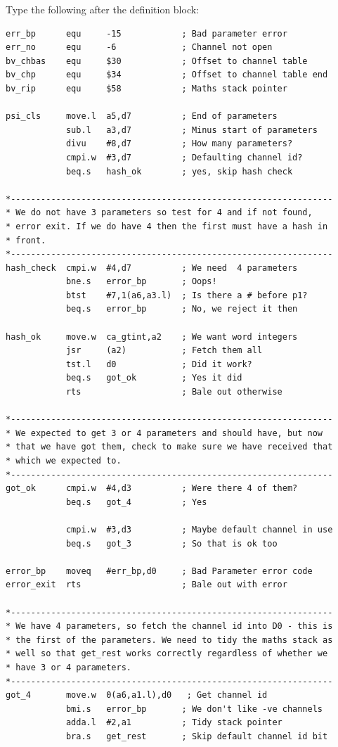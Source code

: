 Type the following after the definition block:
\begin{lstlisting}[firstnumber=13,caption={PSI\_CLS - The Final Version - Part 1},label={lst:PsiClsFinalVersionPart1}]
err_bp      equ     -15            ; Bad parameter error
err_no      equ     -6             ; Channel not open
bv_chbas    equ     $30            ; Offset to channel table
bv_chp      equ     $34            ; Offset to channel table end
bv_rip      equ     $58            ; Maths stack pointer

psi_cls     move.l  a5,d7          ; End of parameters
            sub.l   a3,d7          ; Minus start of parameters
            divu    #8,d7          ; How many parameters?
            cmpi.w  #3,d7          ; Defaulting channel id?
            beq.s   hash_ok        ; yes, skip hash check

*----------------------------------------------------------------
* We do not have 3 parameters so test for 4 and if not found, 
* error exit. If we do have 4 then the first must have a hash in
* front.
*----------------------------------------------------------------
hash_check  cmpi.w  #4,d7          ; We need  4 parameters
            bne.s   error_bp       ; Oops!
            btst    #7,1(a6,a3.l)  ; Is there a # before p1?
            beq.s   error_bp       ; No, we reject it then

hash_ok     move.w  ca_gtint,a2    ; We want word integers
            jsr     (a2)           ; Fetch them all
            tst.l   d0             ; Did it work?
            beq.s   got_ok         ; Yes it did
            rts                    ; Bale out otherwise

*----------------------------------------------------------------
* We expected to get 3 or 4 parameters and should have, but now 
* that we have got them, check to make sure we have received that 
* which we expected to.
*----------------------------------------------------------------
got_ok      cmpi.w  #4,d3          ; Were there 4 of them?
            beq.s   got_4          ; Yes

            cmpi.w  #3,d3          ; Maybe default channel in use
            beq.s   got_3          ; So that is ok too

error_bp    moveq   #err_bp,d0     ; Bad Parameter error code
error_exit  rts                    ; Bale out with error

*----------------------------------------------------------------
* We have 4 parameters, so fetch the channel id into D0 - this is
* the first of the parameters. We need to tidy the maths stack as 
* well so that get_rest works correctly regardless of whether we 
* have 3 or 4 parameters.
*----------------------------------------------------------------
got_4       move.w  0(a6,a1.l),d0   ; Get channel id
            bmi.s   error_bp       ; We don't like -ve channels
            adda.l  #2,a1          ; Tidy stack pointer
            bra.s   get_rest       ; Skip default channel id bit



\end{lstlisting}
